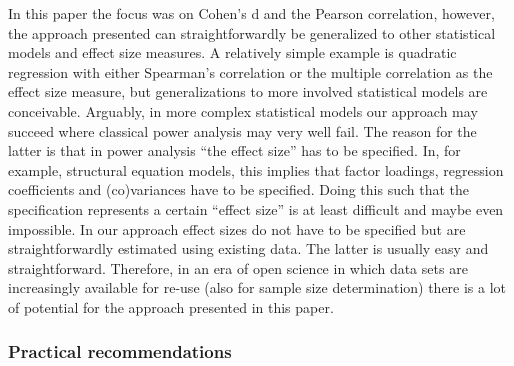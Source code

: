 \documentclass[
  letterpaper,
  DIV=11,
  numbers=noendperiod]{scrartcl}
\begin{document}
In this paper the focus was on Cohen's d and the Pearson correlation,
however, the approach presented can straightforwardly be generalized to
other statistical models and effect size measures. A relatively simple
example is quadratic regression with either Spearman's correlation or
the multiple correlation as the effect size measure, but generalizations
to more involved statistical models are conceivable. Arguably, in more
complex statistical models our approach may succeed where classical
power analysis may very well fail. The reason for the latter is that in
power analysis ``the effect size'' has to be specified. In, for example,
structural equation models, this implies that factor loadings,
regression coefficients and (co)variances have to be specified. Doing
this such that the specification represents a certain ``effect size'' is
at least difficult and maybe even impossible. In our approach effect
sizes do not have to be specified but are straightforwardly estimated
using existing data. The latter is usually easy and straightforward.
Therefore, in an era of open science in which data sets are increasingly
available for re-use (also for sample size determination) there is a lot
of potential for the approach presented in this paper.

\subsubsection{Practical
recommendations}\label{practical-recommendations}
\end{document}
